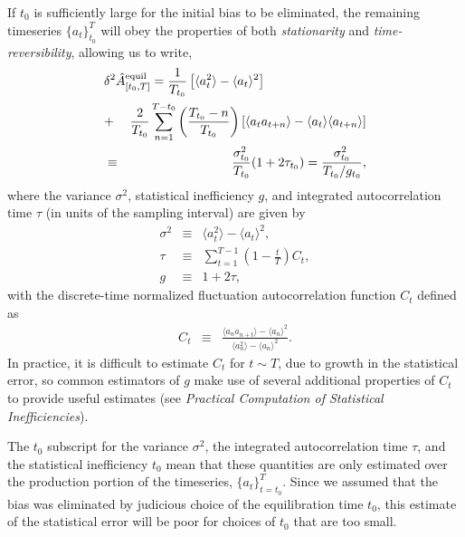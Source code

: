 \documentclass[aps,pre,twocolumn,nofootinbib,superscriptaddress,linenumbers,11point]{revtex4-1}
\newcommand{\expect}[1]{\langle #1 \rangle}                %
\begin{document}
If $t_0$ is sufficiently large for the initial bias to be eliminated, the remaining timeseries $\{a_t\}_{t_0}^T$ will obey the properties of both \emph{stationarity} and \emph{time-reversibility}, allowing us to write,
\begin{eqnarray}
\lefteqn{\delta^2 \hat{A}_{[t_0,T]}^\mathrm{equil} = \frac{1}{T_{t_0}} \left[ \expect{a_t^2} - \expect{a_t}^2 \right]} \nonumber \\
\mbox{} &+& \frac{2}{T_{t_0}} \sum_{n=1}^{T-t_0} \left(\frac{T_{t_0}-n}{T_{t_0}}\right) \left[ \expect{a_t a_{t+n}} - \expect{a_t}\expect{a_{t+n}} \right]  \nonumber \\
&\equiv& \frac{\sigma_{t_0}^2}{T_{t_0}}(1 + 2 \tau_{t_0}) = \frac{\sigma_{t_0}^2}{T_{t_0}/g_{t_0}} ,
\end{eqnarray}
where the variance $\sigma^2$, statistical inefficiency $g$, and integrated autocorrelation time $\tau$ (in units of the sampling interval) are given by
\begin{eqnarray}
\sigma^2 &\equiv& \expect{a_t^2} - \expect{a_t}^2 \label{equation:variance-definition} , \\
\tau &\equiv& \sum_{t=1}^{T-1} \left(1 - \frac{t}{T}\right) C_t \label{equation:integrated-autocorrelation-time-definition} , \\
g &\equiv& 1 + 2 \tau \label{equation:statistical-inefficiency-definition} ,
\end{eqnarray}
with the discrete-time normalized fluctuation autocorrelation function $C_t$ defined as
\begin{eqnarray}
C_t &\equiv& \frac{\expect{a_n a_{n+t}} - \expect{a_n}^2}{\expect{a_n^2} - \expect{a_n}^2} . \label{equation:autocorrelation-definition}
\end{eqnarray}
In practice, it is difficult to estimate $C_t$ for $t \sim T$, due to growth in the statistical error, so common estimators of $g$ make use of several additional properties of $C_t$ to provide useful estimates (see \emph{Practical Computation of Statistical Inefficiencies}).

The $t_0$ subscript for the variance $\sigma^2$, the integrated autocorrelation time $\tau$, and the statistical inefficiency $t_0$ mean that these quantities are only estimated over the production portion of the timeseries, $\{a_t\}_{t=t_0}^T$.
Since we assumed that the bias was eliminated by judicious choice of the equilibration time $t_0$, this estimate of the statistical error will be poor for choices of $t_0$ that are too small.

\end{document}

